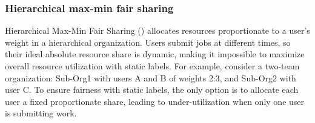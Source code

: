 \subsubsection{Hierarchical max-min fair sharing}
\label{eval:hfs}
Hierarchical Max-Min Fair Sharing () allocates resources proportionate to a user's weight in a hierarchical organization.
Users submit jobs at different times, so their ideal absolute resource share is dynamic, making it impossible to maximize overall resource utilization with static labels.
For example, consider a two-team organization: Sub-Org1 with users A and B of weights 2:3, and Sub-Org2 with user C.
To ensure fairness with static labels, the only option is to allocate each user a fixed proportionate share, leading to under-utilization when only one user is submitting work.


